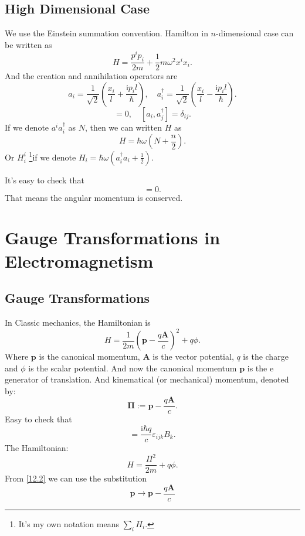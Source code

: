 \documentclass{article}
\theoremstyle{1}
\newcommand{\ii}{\mathrm{i}}
\begin{document}
\subsection{High Dimensional Case}
We use the Einstein summation convention. Hamilton in $n$-dimensional case can be written as
\begin{equation}
    H=\frac{p^ip_i}{2m}+\frac{1}{2}m\omega^2x^ix_i.
\end{equation}
And the creation and annihilation operators are
\begin{equation}
    a_i=\frac{1}{\sqrt{2}}\left(\frac{x_i}{l}+\frac{\ii p_il}{\hbar}\right), \quad a^\dagger_i=\frac{1}{\sqrt{2}}\left(\frac{x_i}{l}-\frac{\ii p_il}{\hbar}\right).
\end{equation}
\begin{equation}
    [a_i,a_j]=0,\quad [a_i,a^\dagger_j]=\delta_{ij}.
\end{equation}
If we denote $a^ia_i^\dagger$ as $N$, then we can written $H$ as 
\begin{equation}
    H=\hbar \omega (N+\frac{n}{2}).
\end{equation}
Or $H^i_i$ \footnote{It's my own notation means $\displaystyle \sum_i H_i.$}if we denote $H_i=\hbar \omega (a_i^\dagger a_i+\frac{1}{2})$.

It's easy to check that 
\begin{equation}
    [a_i^\dagger a_j,H]=0.
\end{equation}
That means the angular momentum is conserved.


\section{Gauge Transformations in Electromagnetism}
\subsection{Gauge Transformations}
\label{charged case}In Classic mechanics, the Hamiltonian is
\begin{equation}
    H=\frac{1}{2m}\left(\mathbf{p}-\frac{q\mathbf{A}}{c}\right)^2+q\phi.
\end{equation}
Where $\mathbf{p}$ is the canonical momentum, $\mathbf{A}$ is the vector potential, $q$ is the charge and $\phi$ is the scalar potential. And now the canonical momentum $\mathbf{p}$ is the e generator of translation. And kinematical (or mechanical) momentum, denoted by:
\begin{equation}\label{12.2}
    \mathbf{\Pi}:=\mathbf{p}-\frac{q\mathbf{A}}{c}.
\end{equation}
Easy to check that
\begin{equation}
    [\Pi_i,\Pi_j]=\frac{\ii\hbar q}{c}\varepsilon_{ijk}B_k.
\end{equation}
The Hamiltonian:
\begin{equation}
    H=\frac{\Pi^2}{2m}+q\phi.
\end{equation}
From \eqref{12.2} we can use the substitution 
\begin{equation}
    \mathbf{p}\longrightarrow \mathbf{p}-\frac{q\mathbf{A}}{c}
\end{equation}
\end{document}
